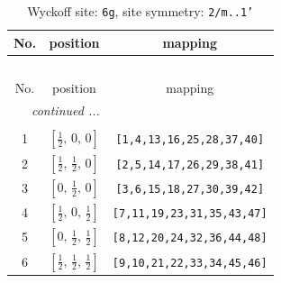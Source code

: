 \documentclass[fleqn,8pt]{jsarticle}
\begin{document}
\renewcommand{\arraystretch}{1.2}
\begin{longtable}{ccc}
\caption{Wyckoff site: {\tt 6g}, site symmetry: {\tt 2/m..1'}}
 \\
 \hline \hline
No. & position & mapping \\ \hline \endfirsthead

\multicolumn{2}{l}{\tablename\ \thetable{}} \\
 \hline \hline
No. & position & mapping \\ \hline \endhead

 \hline \hline
\multicolumn{2}{r}{\footnotesize\it continued ...} \\ \endfoot

 \hline \hline
\multicolumn{2}{r}{} \\ \endlastfoot

1 & $\left[ \frac{1}{2},\, 0,\, 0 \right]$ & {\tt [1,4,13,16,25,28,37,40]} \\ \hline
2 & $\left[ \frac{1}{2},\, \frac{1}{2},\, 0 \right]$ & {\tt [2,5,14,17,26,29,38,41]} \\ \hline
3 & $\left[ 0,\, \frac{1}{2},\, 0 \right]$ & {\tt [3,6,15,18,27,30,39,42]} \\ \hline
4 & $\left[ \frac{1}{2},\, 0,\, \frac{1}{2} \right]$ & {\tt [7,11,19,23,31,35,43,47]} \\ \hline
5 & $\left[ 0,\, \frac{1}{2},\, \frac{1}{2} \right]$ & {\tt [8,12,20,24,32,36,44,48]} \\ \hline
6 & $\left[ \frac{1}{2},\, \frac{1}{2},\, \frac{1}{2} \right]$ & {\tt [9,10,21,22,33,34,45,46]} \\
\end{longtable}
\renewcommand{\arraystretch}{1.2}
\end{document}
